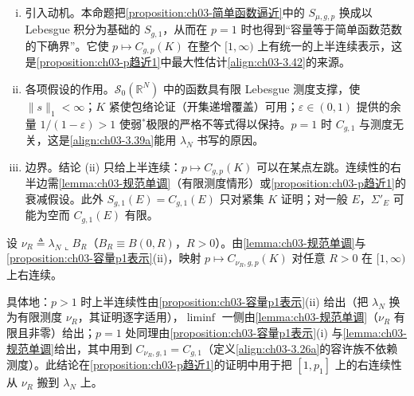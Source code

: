 \documentclass[../../main.tex]{subfiles}%
\begin{document}
\begin{remark}\label{remark:ch03-p右连续无界核}
\begin{enumerate}[(i)]
\item 引入动机。本命题把\cref{proposition:ch03-简单函数逼近}中的 $S_{\mu,g,p}$ 换成以 Lebesgue 积分为基础的 $S_{g,1}$，从而在 $p=1$ 时也得到“容量等于简单函数范数的下确界”。它使 $p\mapsto C_{g,p}(K)$ 在整个 $[1,\infty)$ 上有统一的上半连续表示，这是\cref{proposition:ch03-p趋近1}中最大性估计\eqref{align:ch03-3.42}的来源。

\item 各项假设的作用。$\mathscr S_0(\mathbb{R}^N)$ 中的函数具有限 Lebesgue 测度支撑，使 $\|s\|_1<\infty$；$K$ 紧使包络论证（开集递增覆盖）可用；$\varepsilon\in(0,1)$ 提供的余量 $1/(1-\varepsilon)>1$ 使弱$^*$极限的严格不等式得以保持。$p=1$ 时 $C_{g,1}$ 与测度无关，这是\eqref{align:ch03-3.39a}能用 $\lambda_N$ 书写的原因。

\item 边界。结论 (ii) 只给上半连续：$p\mapsto C_{g,p}(K)$ 可以在某点左跳。连续性的右半边需\cref{lemma:ch03-规范单调}（有限测度情形）或\cref{proposition:ch03-p趋近1}的衰减假设。此外 $S_{g,1}(E)=C_{g,1}(E)$ 只对紧集 $K$ 证明；对一般 $E$，$\Sigma'_E$ 可能为空而 $C_{g,1}(E)$ 有限。
\end{enumerate}
\end{remark}


\begin{remark}\label{remark:ch03-有限测度右连续}
设 $\nu_R\triangleq\lambda_N\llcorner B_R$（$B_R\equiv B(0,R)$，$R>0$）。由\cref{lemma:ch03-规范单调}与\cref{proposition:ch03-容量p1表示}(ii)，映射 $p\mapsto C_{\nu_R,g,p}(K)$ 对任意 $R>0$ 在 $[1,\infty)$ 上右连续。

具体地：$p>1$ 时上半连续性由\cref{proposition:ch03-容量p1表示}(ii) 给出（把 $\lambda_N$ 换为有限测度 $\nu_R$，其证明逐字适用），$\liminf$ 一侧由\cref{lemma:ch03-规范单调}（$\nu_R$ 有限且非零）给出；$p=1$ 处同理由\cref{proposition:ch03-容量p1表示}(i) 与\cref{lemma:ch03-规范单调}给出，其中用到 $C_{\nu_R,g,1}=C_{g,1}$（定义\eqref{align:ch03-3.26a}的容许族不依赖测度）。此结论在\cref{proposition:ch03-p趋近1}的证明中用于把 $[1,p_1]$ 上的右连续性从 $\nu_R$ 搬到 $\lambda_N$ 上。
\end{remark}
\end{document}
